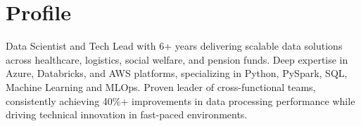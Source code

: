 \section*{Profile}
\noindent
Data Scientist and Tech Lead with 6+ years delivering scalable data solutions across healthcare, logistics, social welfare, and pension funds. Deep expertise in Azure, Databricks, and AWS platforms, specializing in Python, PySpark, SQL, Machine Learning and MLOps. Proven leader of cross-functional teams, consistently achieving 40\%+ improvements in data processing performance while driving technical innovation in fast-paced environments.